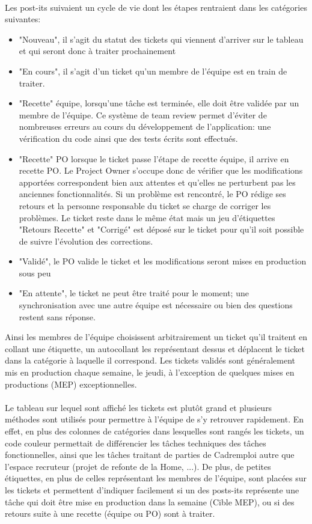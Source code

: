 \paragraph{}
Les post-its suivaient un cycle de vie dont les étapes rentraient dans les catégories suivantes:
\begin{itemize}
  \item "Nouveau", il s'agit du statut des tickets qui viennent d'arriver sur le tableau et qui seront donc à traiter prochainement
  \item "En cours", il s'agit d'un ticket qu'un membre de l'équipe est en train de traiter.
  \item "Recette" équipe, lorsqu'une tâche est terminée, elle doit être validée par un membre de l'équipe.
  Ce système de team review permet d'éviter de nombreuses erreurs au cours du développement de l'application: une vérification du code ainsi que des tests écrits sont effectués.
  \item "Recette" PO lorsque le ticket passe l'étape de recette équipe, il arrive en recette PO.
  Le Project Owner s'occupe donc de vérifier que les modifications apportées correspondent bien aux attentes et qu'elles ne perturbent pas les anciennes fonctionnalités.
  Si un problème est rencontré, le PO rédige ses retours et la personne responsable du ticket se charge de corriger les problèmes.
  Le ticket reste dans le même état mais un jeu d'étiquettes "Retours Recette" et "Corrigé" est déposé sur le ticket pour qu'il soit possible de suivre l'évolution des corrections.
  \item "Validé", le PO valide le ticket et les modifications seront mises en production sous peu
  \item "En attente", le ticket ne peut être traité pour le moment; une synchronisation avec une autre équipe est nécessaire ou bien des questions restent sans réponse.
\end{itemize}
Ainsi les membres de l'équipe choisissent arbitrairement un ticket qu'il traitent en collant une étiquette, un autocollant les représentant dessus et déplacent le ticket dans la catégorie à laquelle il correspond.
Les tickets validés sont généralement mis en production chaque semaine, le jeudi, à l'exception de quelques mises en productions (MEP) exceptionnelles.
\paragraph{}
Le tableau sur lequel sont affiché les tickets est plutôt grand et plusieurs méthodes sont utilisés pour permettre à l'équipe de s'y retrouver rapidement.
En effet, en plus des colonnes de catégories dans lesquelles sont rangés les tickets, un code couleur permettait de différencier les tâches techniques des tâches fonctionnelles, ainsi que les tâches traitant de parties de Cadremploi autre que l'espace recruteur (projet de refonte de la Home, ...).
De plus, de petites étiquettes, en plus de celles représentant les membres de l'équipe, sont placées sur les tickets et permettent d'indiquer facilement si un des posts-its représente une tâche qui doit être mise en production dans la semaine (Cible MEP), ou si des retours suite à une recette (équipe ou PO) sont à traiter.
